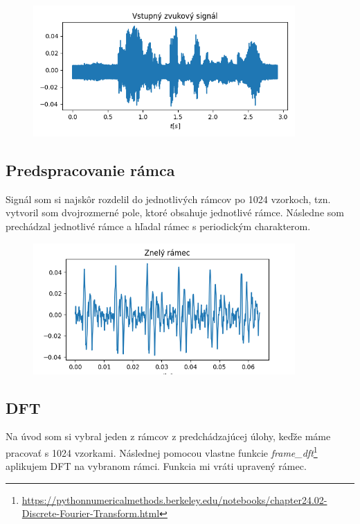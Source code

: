 \documentclass[a4paper,oneside]{article}
\begin{document}
    \begin{figure}[h]
	    \begin{center}
		    \includegraphics[width=10cm,keepaspectratio]{uloha4-1.png}
		\end{center}
	\end{figure}
	
	\subsection{Predspracovanie rámca}
	
	Signál som si najskôr rozdelil do jednotlivých rámcov po 1024 vzorkoch, tzn. vytvoril som dvojrozmerné pole, ktoré obsahuje jednotlivé rámce. Následne som prechádzal jednotlivé rámce a hľadal rámec s periodickým charakterom.
	
	 \begin{figure}[h]
	    \begin{center}
		    \includegraphics[width=10cm,keepaspectratio]{uloha4-2.png}
		\end{center}
	\end{figure}
	\newpage
	
	\subsection{DFT}
	
	Na úvod som si vybral jeden z rámcov z predchádzajúcej úlohy, keďže máme pracovať s 1024 vzorkami. Následnej pomocou vlastne funkcie \textit{frame\_dft}\footnote{\url{https://pythonnumericalmethods.berkeley.edu/notebooks/chapter24.02-Discrete-Fourier-Transform.html}} aplikujem DFT na vybranom rámci. Funkcia mi vráti upravený rámec.
	
\end{document}
